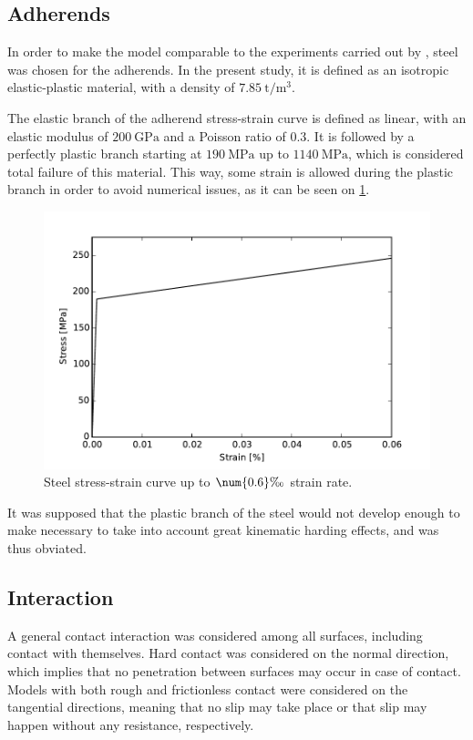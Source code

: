 \documentclass[
documentsize = a4, %
font = cmr, %
typesize = 11, %
printmode = true,
onehalfspacing = true,
language = en, %
titlepage = udciccp, %
degree = pt, %
dedication = true,
acknowledgements = true,
abstract-en = true,
abstract-es = false,
abstract-ga = false,
epigraphs = true,
toc = true,
lof = true,
lot = true,
frontmatterintoc = false,
notation = false,
minimal = false,
]{UDCthesis}
\begin{document}
\subsection{Adherends}

In order to make the model comparable to the experiments carried out by \citet{Peroni2009}, steel was chosen for the adherends. In the present study, it is defined as an isotropic elastic-plastic material, with a density of $\SI{7.85}{\tonne/\m^3}$.

The elastic branch of the adherend stress-strain curve is defined as linear, with an elastic modulus of $\SI{200}{\GPa}$ and a Poisson ratio of $\num{0.3}$. It is followed by a perfectly plastic branch starting at $\SI{190}{\MPa}$ up to $\SI{1140}{\MPa}$, which is considered total failure of this material. This way, some strain is allowed during the plastic branch in order to avoid numerical issues, as it can be seen on \cref{fig:steel}.

\begin{figure}
	\centering
	\includegraphics[width=0.7\linewidth]{IMG_CUTRES/steel}
	\caption{Steel stress-strain curve up to $\num{0.6}\text{\textperthousand}$ strain rate.}
	\label{fig:steel}
\end{figure}

It was supposed that the plastic branch of the steel would not develop enough to make necessary to take into account great kinematic harding effects, and was thus obviated.

\subsection{Interaction}

A general contact interaction was considered among all surfaces, including contact with themselves. Hard contact was considered on the normal direction, which implies that no penetration between surfaces may occur in case of contact. Models with both rough and frictionless contact were considered on the tangential directions, meaning that no slip may take place or that slip may happen without any resistance, respectively.
\end{document}
